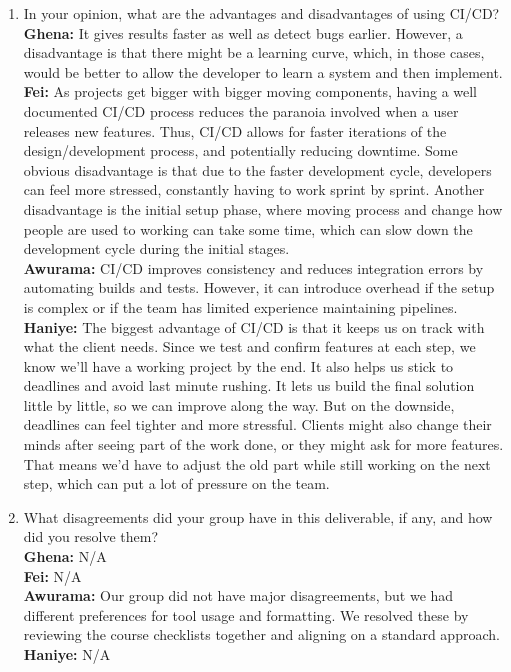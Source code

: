 \documentclass{article}
\begin{document}
\begin{enumerate}
    \item In your opinion, what are the advantages and disadvantages of using
    CI/CD? \\
      \textbf{Ghena:} It gives results faster as well as detect bugs earlier. However, a disadvantage is that there might be a learning curve, which, in those cases, would be better to allow the developer to learn a system and then implement.
      \\\textbf{Fei:} As projects get bigger with bigger moving components, having a well documented CI/CD process reduces the paranoia involved when a user releases new features. Thus, CI/CD allows for faster iterations of the design/development process, and potentially reducing downtime. Some obvious disadvantage is that due to the faster development cycle, developers can feel more stressed, constantly having to work sprint by sprint. Another disadvantage is the initial setup phase, where moving process and change how people are used to working can take some time, which can slow down the development cycle during the initial stages.
     \\\textbf{Awurama:} CI/CD improves consistency and reduces integration errors by
    automating builds and tests. However, it can introduce overhead if the setup is
    complex or if the team has limited experience maintaining pipelines.
    \\\textbf{Haniye:} The biggest advantage of CI/CD is that it keeps us on track with what the client needs. Since we test and confirm features at each step, we know we’ll have a working project by the end. It also helps us stick to deadlines and avoid last minute rushing. It lets us build the final solution little by little, so we can improve along the way. But on the downside, deadlines can feel tighter and more stressful. Clients might also change their minds after seeing part of the work done, or they might ask for more features. That means we’d have to adjust the old part while still working on the next step, which can put a lot of pressure on the team.
    \item What disagreements did your group have in this deliverable, if any,
    and how did you resolve them? \\
    \textbf{Ghena:} N/A
    \\\textbf{Fei:} N/A
    \\\textbf{Awurama:} Our group did not have major disagreements, but we had
    different preferences for tool usage and formatting. We resolved these by reviewing
    the course checklists together and aligning on a standard approach.
    \\\textbf{Haniye:} N/A

\end{enumerate}
\end{document}
